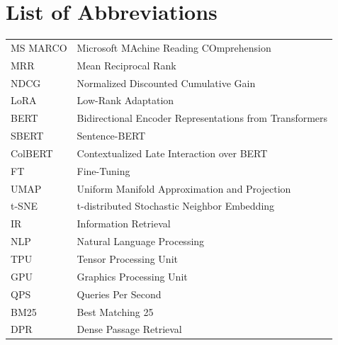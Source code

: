\chapter*{List of Abbreviations}
\begin{tabular}{@{}ll}
MS MARCO & Microsoft MAchine Reading COmprehension \\
MRR & Mean Reciprocal Rank \\
NDCG & Normalized Discounted Cumulative Gain \\
LoRA & Low-Rank Adaptation \\
BERT & Bidirectional Encoder Representations from Transformers \\
SBERT & Sentence-BERT \\
ColBERT & Contextualized Late Interaction over BERT \\
FT & Fine-Tuning \\
UMAP & Uniform Manifold Approximation and Projection \\
t-SNE & t-distributed Stochastic Neighbor Embedding \\
IR & Information Retrieval \\
NLP & Natural Language Processing \\
TPU & Tensor Processing Unit \\
GPU & Graphics Processing Unit \\
QPS & Queries Per Second \\
BM25 & Best Matching 25 \\
DPR & Dense Passage Retrieval \\
\end{tabular}
